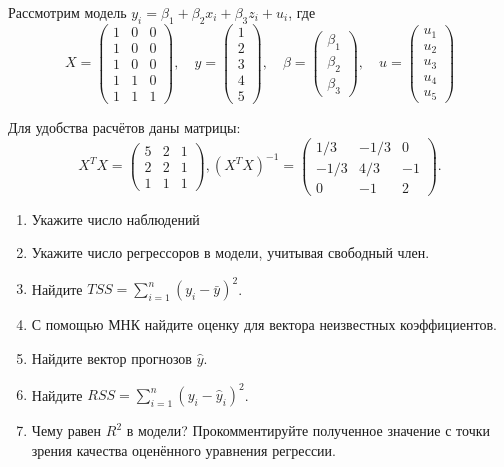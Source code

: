 \documentclass[12pt]{article}
\newcommand{\hy}{\hat{y}}
\newcommand{\RSS}{RSS}
\newcommand{\TSS}{TSS}
\begin{document}
\begin{problem}
    Рассмотрим модель $y_i = \beta_1 + \beta_2 x_{i} + \beta_3 z_i + u_i$, 
    где
    \[
    X = \begin{pmatrix} 
      1 & 0 & 0 \\ 
      1 & 0 & 0 \\ 
      1 & 0 & 0 \\ 
      1 & 1 & 0 \\ 
      1 & 1 & 1 
    \end{pmatrix}, \quad
    y = \begin{pmatrix} 1 \\ 2 \\ 3 \\ 4 \\ 5 \end{pmatrix}, \quad
    \beta = \begin{pmatrix} \beta_1 \\ \beta_2 \\ \beta_3 \end{pmatrix}, \quad
    u = \begin{pmatrix} u_1 \\ u_2 \\ u_3 \\ u_4 \\ u_5  \end{pmatrix}
    \]
       
    Для удобства расчётов даны матрицы:
    \[
    X^TX = \begin{pmatrix} 
      5 & 2 & 1 \\ 
      2 & 2 & 1\\ 
      1 & 1 & 1 
    \end{pmatrix},
    (X^TX)^{-1}= \begin{pmatrix} 
      1/3 & -1/3 & 0 \\ 
      -1/3 & 4/3 & -1 \\ 
      0 & -1 & 2 \end{pmatrix}.
    \]   
    
    \begin{enumerate}
    \item Укажите число наблюдений
    \item Укажите число регрессоров в модели, учитывая свободный член.
    \item Найдите $\TSS = \sum_{i=1}^n (y_i - \bar y)^2$.
    \item С помощью МНК найдите оценку для вектора неизвестных коэффициентов.
    \item Найдите вектор прогнозов $\hy$.
    \item Найдите $\RSS = \sum_{i=1}^n (y_i - \hy_i)^2$.
    \item Чему равен $R^2$ в модели? Прокомментируйте полученное значение с точки зрения качества оценённого уравнения регрессии.
    \end{enumerate}
\end{problem}
\end{document}
